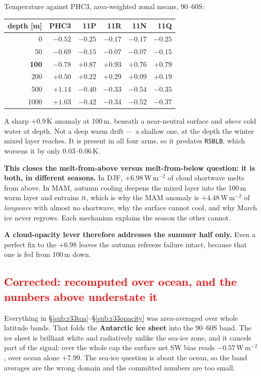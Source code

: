 \documentclass[10pt]{article}
\begin{document}
Temperature against PHC3, area-weighted zonal means, 90--60S:

\begin{center}\small
\begin{tabular}{rrrrrr}
\toprule
depth [m] & PHC3 & 11P & 11R & 11N & 11Q \\
\midrule
0 & $-0.52$ & $-0.25$ & $-0.17$ & $-0.17$ & $-0.25$ \\
50 & $-0.69$ & $-0.15$ & $-0.07$ & $-0.07$ & $-0.15$ \\
\textbf{100} & $-0.78$ & $\mathbf{+0.87}$ & $\mathbf{+0.93}$ & $\mathbf{+0.76}$ & $\mathbf{+0.79}$ \\
200 & $+0.50$ & $+0.22$ & $+0.29$ & $+0.09$ & $+0.19$ \\
500 & $+1.14$ & $-0.40$ & $-0.33$ & $-0.54$ & $-0.35$ \\
1000 & $+1.03$ & $-0.42$ & $-0.34$ & $-0.52$ & $-0.37$ \\
\bottomrule
\end{tabular}
\end{center}

A sharp $+0.9$\,K anomaly at 100\,m, beneath a near-neutral surface and \emph{above} cold
water at depth. Not a deep warm drift --- a shallow one, at the depth the winter mixed
layer reaches. It is present in all four arms, so it predates \texttt{RSBLB}, which
worsens it by only $0.03$--$0.06$\,K.

\textbf{This closes the melt-from-above versus melt-from-below question: it is both, in
different seasons.} In DJF, $+6.98$\,W\,m$^{-2}$ of cloud shortwave melts from above. In
MAM, autumn cooling deepens the mixed layer into the 100\,m warm layer and entrains it,
which is why the MAM anomaly is $+4.48$\,W\,m$^{-2}$ of \emph{longwave} with almost no
shortwave, why the surface cannot cool, and why March ice never regrows. Each mechanism
explains the season the other cannot.

\textbf{A cloud-opacity lever therefore addresses the summer half only.} Even a perfect
fix to the $+6.98$ leaves the autumn refreeze failure intact, because that one is fed
from 100\,m down.

\subsection{\textcolor{red}{Corrected: recomputed over ocean, and the numbers above understate it}}\label{sub:r33ocean}

Everything in \S\ref{sub:r33toa}--\S\ref{sub:r33opacity} was area-averaged over whole
latitude bands. That folds the \textbf{Antarctic ice sheet} into the 90--60S band. The ice
sheet is brilliant white and radiatively unlike the sea-ice zone, and it cancels part of
the signal: over the whole cap the surface net SW bias reads $-0.57$\,W\,m$^{-2}$, over
ocean alone $+7.99$. The sea-ice question is about the ocean, so the band averages are the
wrong domain and the committed numbers are too small.
\end{document}
